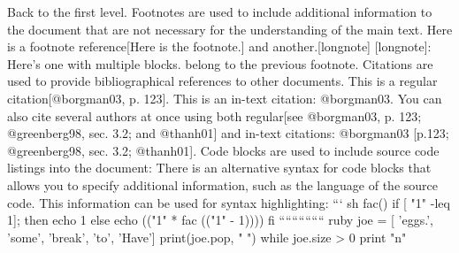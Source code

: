 {}Back to the first level.
\markdownRendererBlockQuoteEnd \markdownRendererInterblockSeparator
{}Footnotes are used to include additional information to the document that are not necessary for the understanding of the main text. Here is a footnote reference\markdownRendererCircumflex{}[Here is the footnote.] and another.[\markdownRendererCircumflex{}longnote]\markdownRendererInterblockSeparator
{}[\markdownRendererCircumflex{}longnote]: Here's one with multiple blocks.\markdownRendererInterblockSeparator
{}\markdownRendererInterblockSeparator
{}belong to the previous footnote.\markdownRendererInterblockSeparator
{}\markdownRendererInterblockSeparator
{}Citations are used to provide bibliographical references to other documents. This is a regular citation\markdownRendererTilde{}[@borgman03, p. 123]. This is an in-text citation: @borgman03. You can also cite several authors at once using both regular\markdownRendererTilde{}[see @borgman03, p. 123; @greenberg98, sec. 3.2; and @thanh01] and in-text citations: @borgman03 [p.123; @greenberg98, sec. 3.2; @thanh01].\markdownRendererInterblockSeparator
{}Code blocks are used to include source code listings into the document:\markdownRendererInterblockSeparator
{}\markdownRendererInterblockSeparator
{}There is an alternative syntax for code blocks that allows you to specify additional information, such as the language of the source code. This information can be used for syntax highlighting:\markdownRendererInterblockSeparator
{}``` sh\markdownRendererInterblockSeparator
{}\markdownRendererSectionBegin
{}\markdownRendererInterblockSeparator
{}fac() \markdownRendererLeftBrace{} if [ "\markdownRendererDollarSign{}1" -leq 1]; then echo 1 else echo \markdownRendererDollarSign{}(("\markdownRendererDollarSign{}1" * fac \markdownRendererDollarSign{}(("\markdownRendererDollarSign{}1" - 1)))) fi \markdownRendererRightBrace{} ``````````````\markdownRendererInterblockSeparator
{}\markdownRendererTilde{}\markdownRendererTilde{}\markdownRendererTilde{}\markdownRendererTilde{}\markdownRendererTilde{}\markdownRendererTilde{} ruby\markdownRendererInterblockSeparator
{}
\markdownRendererSectionEnd \markdownRendererSectionBegin
{}\markdownRendererInterblockSeparator
{}joe = [ 'eggs.', 'some', 'break', 'to', 'Have'] print(joe.pop, " ") while joe.size > 0 print "\markdownRendererBackslash{}n" \markdownRendererTilde{}\markdownRendererTilde{}\markdownRendererTilde{}\markdownRendererTilde{}\markdownRendererTilde{}\markdownRendererTilde{}
\markdownRendererSectionEnd \markdownRendererDocumentEnd